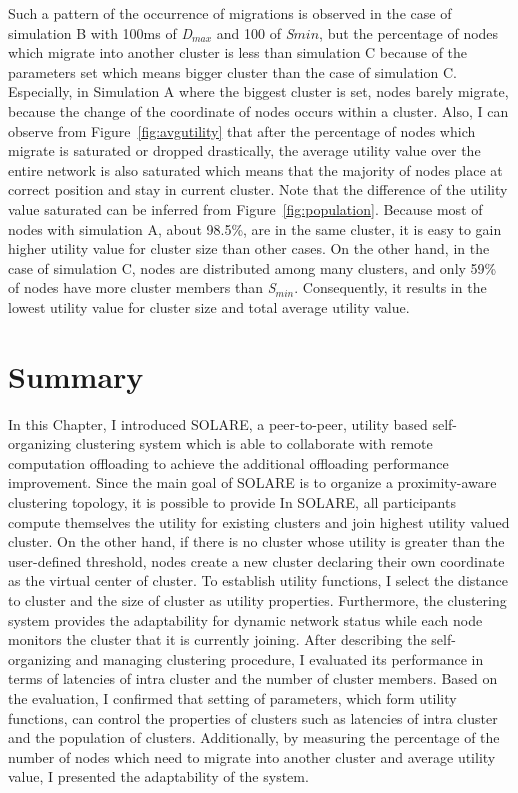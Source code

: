 %
Such a pattern of the occurrence of migrations is observed in the case
of simulation B with 100ms of \textit{D$_{max}$} and 100 of
\textit{S${min}$}, but the percentage of nodes which migrate into
another cluster is less than simulation C because of the parameters set
which means bigger cluster than the case of simulation C.
%
Especially, in Simulation A where the biggest cluster is set, nodes
barely migrate, because the change of the coordinate of nodes occurs
within a cluster.
%
Also, I can observe from Figure~\ref{fig:avgutility} that after the
percentage of nodes which migrate is saturated or dropped drastically,
the average utility value over the entire network is also saturated
which means that the majority of nodes place at correct position and
stay in current cluster.
%
Note that the difference of the utility value saturated can be inferred
from Figure~\ref{fig:population}.
%
Because most of nodes with simulation A, about 98.5\%, are in the same
cluster, it is easy to gain higher utility value for cluster size than
other cases.
%
On the other hand, in the case of simulation C, nodes are distributed
among many clusters, and only 59\% of nodes have more cluster members
than \textit{S$_{min}$}.
%
Consequently, it results in the lowest utility value for cluster size
and total average utility value.
%
%
%

\section{Summary}
\label{solare:summary}
In this Chapter, I introduced SOLARE, a peer-to-peer, utility based
self-organizing clustering system which is able to collaborate with
remote computation offloading to achieve the additional offloading
performance improvement.
%
Since the main goal of SOLARE is to organize a proximity-aware
clustering topology, it is possible to provide 
%
In SOLARE, all participants compute themselves the utility for existing clusters
and join highest utility valued cluster.
%
On the other hand, if there is no cluster whose utility is greater than
the user-defined threshold, nodes create a new cluster declaring their
own coordinate as the virtual center of cluster.
%
To establish utility functions, I select the distance to cluster and the
size of cluster as utility properties.
%
Furthermore, the clustering system provides the adaptability for dynamic
network status while each node monitors the cluster that it is currently
joining.
%
After describing the self-organizing and managing clustering procedure,
I evaluated its performance in terms of latencies of intra cluster and
the number of cluster members.
%
Based on the evaluation, I confirmed that setting of parameters, which
form utility functions, can control the properties of clusters such as
latencies of intra cluster and the population of clusters.
%
Additionally, by measuring the percentage of the number of nodes which
need to migrate into another cluster and average utility value, I
presented the adaptability of the system.
%
